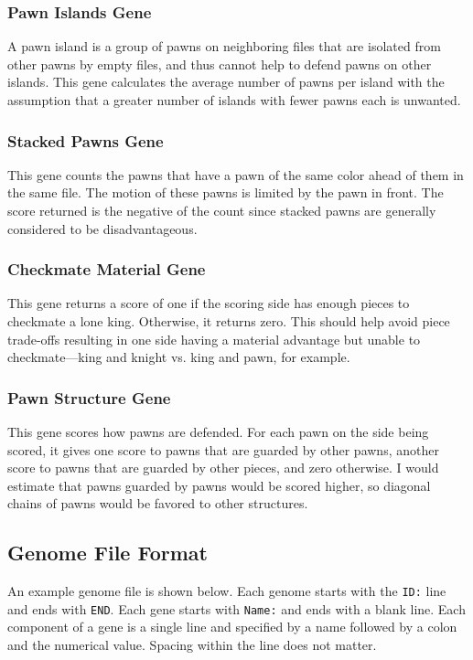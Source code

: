 \documentclass[letterpaper]{article}
\renewcommand{\_}{\allowbreak\textunderscore\allowbreak}
\begin{document}
\subsubsection{Pawn Islands Gene}
A pawn island is a group of pawns on neighboring files that are isolated from other pawns by empty files, and thus cannot help to defend pawns on other islands. This gene calculates the average number of pawns per island with the assumption that a greater number of islands with fewer pawns each is unwanted.

\subsubsection{Stacked Pawns Gene}
This gene counts the pawns that have a pawn of the same color ahead of them in the same file. The motion of these pawns is limited by the pawn in front. The score returned is the negative of the count since stacked pawns are generally considered to be disadvantageous.

\subsubsection{Checkmate Material Gene}
This gene returns a score of one if the scoring side has enough pieces to checkmate a lone king. Otherwise, it returns zero. This should help avoid piece trade-offs resulting in one side having a material advantage but unable to checkmate---king and knight vs\@. king and pawn, for example.

\subsubsection{Pawn Structure Gene}
This gene scores how pawns are defended. For each pawn on the side being scored, it gives one score to pawns that are guarded by other pawns, another score to pawns that are guarded by other pieces, and zero otherwise. I would estimate that pawns guarded by pawns would be scored higher, so diagonal chains of pawns would be favored to other structures.


\subsection{Genome File Format}\label{genome-file-format}
An example genome file is shown below. Each genome starts with the \verb|ID:| line and ends with \verb|END|. Each gene starts with \verb|Name:| and ends with a blank line. Each component of a gene is a single line and specified by a name followed by a colon and the numerical value. Spacing within the line does not matter.

\end{document}
